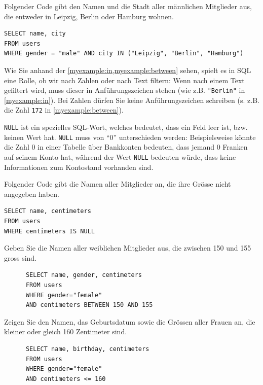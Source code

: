 \begin{myexample}\label{myexample:in}
Folgender Code gibt den Namen und die Stadt aller männlichen Mitglieder aus, die entweder in Leipzig, Berlin oder Hamburg wohnen.

\begin{lstlisting}
SELECT name, city
FROM users 
WHERE gender = "male" AND city IN ("Leipzig", "Berlin", "Hamburg")
\end{lstlisting}
\end{myexample}


\begin{mycaution}
Wie Sie anhand der \cref{myexample:in,myexample:between} sehen, spielt es in SQL eine Rolle, ob  wir nach Zahlen oder nach
  Text filtern: Wenn nach einem Text gefiltert wird, muss dieser in Anführungszeichen stehen (wie z.B.
  \lstinline|"Berlin"| in \cref{myexample:in}). Bei Zahlen dürfen Sie keine Anführungszeichen schreiben (s. z.B. die Zahl
  \lstinline|172| in \cref{myexample:between}).
\end{mycaution}

\lstinline|NULL| ist ein spezielles \gls{SQL}-Wort, welches bedeutet, dass ein Feld leer ist, bzw. keinen
Wert hat. \lstinline|NULL| muss von \enquote{0} unterschieden werden: Beispielsweise könnte die Zahl 0 in einer 
Tabelle über Bankkonten bedeuten, dass jemand 0 Franken auf seinem Konto hat, während der Wert \lstinline|NULL| bedeuten würde, dass keine 
Informationen zum Kontostand vorhanden sind.

\begin{myexample}
  Folgender Code gibt die Namen aller Mitglieder an, die ihre Grösse nicht angegeben haben.
\begin{lstlisting}
SELECT name, centimeters
FROM users 
WHERE centimeters IS NULL
\end{lstlisting}
\end{myexample}


\begin{myexercise}
  Geben Sie die Namen aller weiblichen Mitglieder aus, die zwischen 150 und 155 gross sind.
  \begin{myanswer}
    \begin{lstlisting}
      SELECT name, gender, centimeters
      FROM users
      WHERE gender="female"
      AND centimeters BETWEEN 150 AND 155
    \end{lstlisting}
  \end{myanswer}
\end{myexercise}
\begin{myexercise}
  Zeigen Sie den Namen, das Geburtsdatum sowie die Grössen aller Frauen an, die kleiner oder gleich 160 Zentimeter sind.
  \begin{myanswer}
    \begin{lstlisting}
      SELECT name, birthday, centimeters
      FROM users
      WHERE gender="female"
      AND centimeters <= 160
    \end{lstlisting}
  \end{myanswer}
\end{myexercise}


